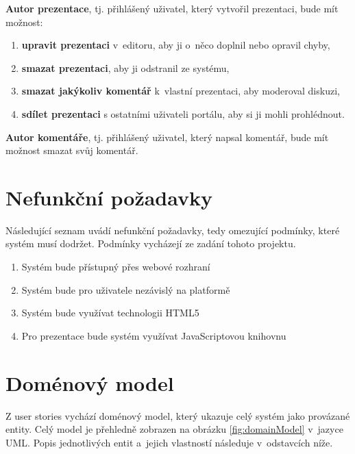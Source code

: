 \documentclass[11pt,twoside,a4paper]{book}
\begin{document}
\noindent \textbf{Autor prezentace}, tj. přihlášený uživatel, který vytvořil prezentaci, bude mít možnost:
\begin{enumerate}
	\item \textbf{upravit prezentaci} v~editoru, aby ji o~něco doplnil nebo opravil chyby,
	\item \textbf{smazat prezentaci}, aby ji odstranil ze systému,
	\item \textbf{smazat jakýkoliv komentář} k~vlastní prezentaci, aby moderoval diskuzi,
	\item \textbf{sdílet prezentaci} s ostatními uživateli portálu, aby si ji mohli prohlédnout.
\end{enumerate}


\noindent \textbf{Autor komentáře}, tj. přihlášený uživatel, který napsal komentář, bude mít možnost smazat svůj komentář.


\section{Nefunkční požadavky}
Následující seznam uvádí nefunkční požadavky, tedy omezující podmínky, které systém musí dodržet. Podmínky vycházejí ze zadání tohoto projektu.

\begin{enumerate}
	\item Systém bude přístupný přes webové rozhraní
	\item Systém bude pro uživatele nezávislý na platformě
	\item Systém bude využívat technologii HTML5
	\item Pro prezentace bude systém využívat Java\-Scriptovou knihovnu
\end{enumerate}



\section{Doménový model}
Z user stories vychází doménový model, který ukazuje celý systém jako provázané entity. Celý model je přehledně zobrazen na obrázku \ref{fig:domainModel} v~jazyce UML. Popis jednotlivých entit a~jejich vlastností následuje v~odstavcích níže.
\end{document}
